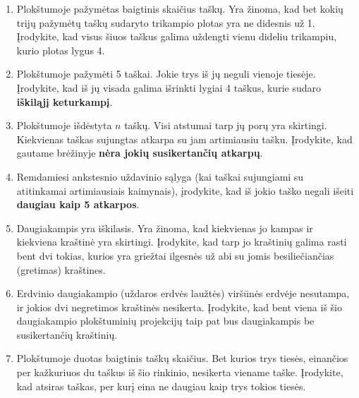 \documentclass[11pt,a4paper]{scrartcl}
\begin{document}
\begin{enumerate}
    \item Plokštumoje pažymėtas baigtinis skaičius taškų. Yra žinoma, kad bet kokių trijų pažymėtų taškų sudaryto trikampio plotas yra ne didesnis už 1. Įrodykite, kad visus šiuos taškus galima uždengti vienu dideliu trikampiu, kurio plotas lygus 4.
    \item Plokštumoje pažymėti 5 taškai. Jokie trys iš jų neguli vienoje tiesėje. Įrodykite, kad iš jų visada galima išrinkti lygiai 4 taškus, kurie sudaro \textbf{iškiląjį keturkampį}.
    \item Plokštumoje išdėstyta $n$ taškų. Visi atstumai tarp jų porų yra skirtingi. Kiekvienas taškas sujungtas atkarpa su jam artimiausiu tašku. Įrodykite, kad gautame brėžinyje \textbf{nėra jokių susikertančių atkarpų}.
    \item Remdamiesi ankstesnio uždavinio sąlyga (kai taškai sujungiami su atitinkamai artimiausiais kaimynais), įrodykite, kad iš jokio taško negali išeiti \textbf{daugiau kaip 5 atkarpos}.
    \item Daugiakampis yra iškilasis. Yra žinoma, kad kiekvienas jo kampas ir kiekviena kraštinė yra skirtingi. Įrodykite, kad tarp jo kraštinių galima rasti bent dvi tokias, kurios yra griežtai ilgesnės už abi su jomis besiliečiančias (gretimas) kraštines.
    \item Erdvinio daugiakampio (uždaros erdvės laužtės) viršūnės erdvėje nesutampa, ir jokios dvi negretimos kraštinės nesikerta. Įrodykite, kad bent viena iš šio daugiakampio plokštuminių projekcijų taip pat bus daugiakampis be susikertančių kraštinių.
    \item Plokštumoje duotas baigtinis taškų skaičius. Bet kurios trys tiesės, einančios per kažkuriuos du taškus iš šio rinkinio, nesikerta viename taške. Įrodykite, kad atsiras taškas, per kurį eina ne daugiau kaip trys tokios tiesės.
    

\end{enumerate}
\end{document}
